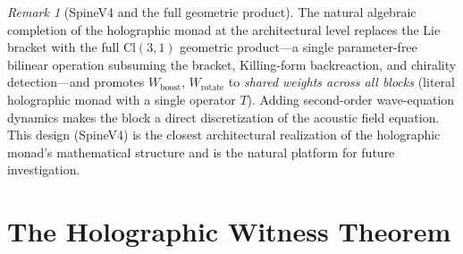 \documentclass[11pt,a4paper]{article}
\theoremstyle{plain}
\theoremstyle{definition}
\theoremstyle{remark}
\newtheorem{remark}[theorem]{Remark}
\numberwithin{equation}{section}
\providecommand{\Cl}{\mathrm{Cl}}
\begin{document}
\begin{remark}[SpineV4 and the full geometric product]
\label{rmk:spine-v4-forward}
The natural algebraic completion of the holographic monad at
the architectural level replaces the Lie bracket with the full
$\Cl(3,1)$ geometric product---a single parameter-free bilinear
operation subsuming the bracket, Killing-form backreaction, and
chirality detection---and promotes $W_{\mathrm{boost}}$,
$W_{\mathrm{rotate}}$ to \emph{shared weights across all blocks}
(literal holographic monad with a single operator $T$).  Adding
second-order wave-equation dynamics makes the block a direct
discretization of the acoustic field equation.  This design
(SpineV4) is the closest architectural realization of the
holographic monad's mathematical structure and is the natural
platform for future investigation.
\end{remark}


\section{The Holographic Witness Theorem}
\label{sec:hwt}
\end{document}
